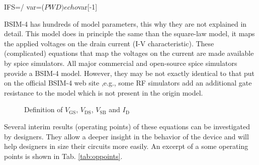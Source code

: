 \documentclass{article}[11pt]
\begin{document}
\notetitle

\bash[stdout]
IFS=/ 
var=($PWD)
echo ${var[-1]}
\END%

BSIM-4 has hundreds of model parameters, this why they are not explained in 
detail.
This model does in principle the same than the square-law 
model\cite{mosfet-square-law}, it maps the applied voltages on the drain 
current (I-V characteristic). 
These (complicated) equations that map the voltages on the current are made 
available by \gls{spice} simulators.
All major commercial and open-source \gls{spice} simulators provide a 
BSIM-4 model. 
However, they may be not exactly identical to that put on the official 
BSIM-4 web site \cite{liu-mosfetmodel-01} ,e.g., some RF simulators add an 
additional gate resistance to the model which is not present in the origin model.


\begin{figure}[H]
  \centering
  \begin{circuitikz}
    
  \end{circuitikz}
  \caption{Definition of $V_{\mathrm{GS}}$, $V_{\mathrm{DS}}$, $V_{\mathrm{SB}}$ and $I_{\mathrm{D}}$}
  \label{fig:testbench}
\end{figure}


Several interim results (operating points) of these equations can be 
investigated by designers.
They allow a deeper insight in the behavior of the device and will help 
designers in size their circuits more easily.
An excerpt of a some operating points is shown in Tab. \ref{tab:oppoints}.
\end{document}
